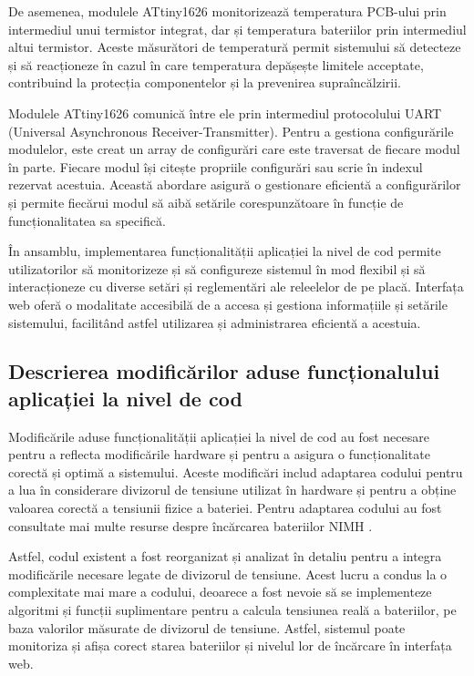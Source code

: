 De asemenea, modulele ATtiny1626 monitorizează temperatura PCB-ului prin intermediul unui termistor integrat, dar și temperatura bateriilor prin intermediul altui termistor. Aceste măsurători de temperatură permit sistemului să detecteze și să reacționeze în cazul în care temperatura depășește limitele acceptate, contribuind la protecția componentelor și la prevenirea supraîncălzirii.

Modulele ATtiny1626 comunică între ele prin intermediul protocolului UART (Universal Asynchronous Receiver-Transmitter). Pentru a gestiona configurările modulelor, este creat un array de configurări care este traversat de fiecare modul în parte. Fiecare modul își citește propriile configurări sau scrie în indexul rezervat acestuia. Această abordare asigură o gestionare eficientă a configurărilor și permite fiecărui modul să aibă setările corespunzătoare în funcție de funcționalitatea sa specifică.

În ansamblu, implementarea funcționalității aplicației la nivel de cod permite utilizatorilor să monitorizeze și să configureze sistemul în mod flexibil și să interacționeze cu diverse setări și reglementări ale releelelor de pe placă. Interfața web oferă o modalitate accesibilă de a accesa și gestiona informațiile și setările sistemului, facilitând astfel utilizarea și administrarea eficientă a acestuia.

\subsection{Descrierea modificărilor aduse funcționalului aplicației la nivel de cod}

Modificările aduse funcționalității aplicației la nivel de cod au fost necesare pentru a reflecta modificările hardware și pentru a asigura o funcționalitate corectă și optimă a sistemului. Aceste modificări includ adaptarea codului pentru a lua în considerare divizorul de tensiune utilizat în hardware și pentru a obține valoarea corectă a tensiunii fizice a bateriei. Pentru adaptarea codului au fost consultate mai multe resurse despre încărcarea bateriilor NIMH \cite{analog} \cite{globtek}.

Astfel, codul existent a fost reorganizat și analizat în detaliu pentru a integra modificările necesare legate de divizorul de tensiune. Acest lucru a condus la o complexitate mai mare a codului, deoarece a fost nevoie să se implementeze algoritmi și funcții suplimentare pentru a calcula tensiunea reală a bateriilor, pe baza valorilor măsurate de divizorul de tensiune. Astfel, sistemul poate monitoriza și afișa corect starea bateriilor și nivelul lor de încărcare în interfața web.

